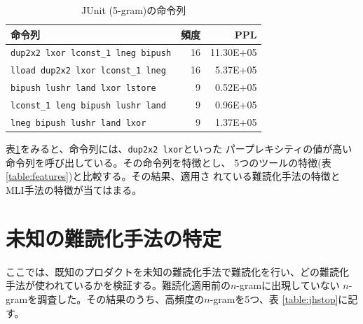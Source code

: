 \documentclass[12pt,twoside]{jbook}
\begin{document}
\begin{table}[t]
  \centering
  \footnotesize{
    \caption{JUnit (5-gram)の命令列}\label{table:junit}
  \begin{tabular}{l|r|r}
    命令列 & 頻度 & PPL\\ \hline
    \texttt{dup2x2 lxor lconst\_1 lneg bipush}   & 16 & 11.30E+05 \\
    \texttt{lload dup2x2 lxor lconst\_1 lneg}    & 16 &   5.37E+05 \\
    \texttt{bipush lushr land lxor lstore}       &  9 &   0.52E+05 \\
    \texttt{lconst\_1 leng bipush lushr land}    &  9 &   0.96E+05 \\
    \texttt{lneg bipush lushr land lxor}         &  9 &  1.37E+05 \\
  \end{tabular}}
\end{table}

表\ref{table:junit}をみると、命令列には、\texttt{dup2x2 lxor}といった
パープレキシティの値が高い命令列を呼び出している。その命令列を特徴とし、
5つのツールの特徴(表\ref{table:features})と比較する。その結果、適用さ
れている難読化手法の特徴とMLI手法の特徴が当てはまる。

\section{未知の難読化手法の特定}

ここでは、既知のプロダクトを未知の難読化手法で難読化を行い、どの難読化
手法が使われているかを検証する。難読化適用前の$n$-gramに出現していない
$n$-gramを調査した。その結果のうち、高頻度の$n$-gramを5つ、表
\ref{table:jhstop}に記す。
\end{document}
